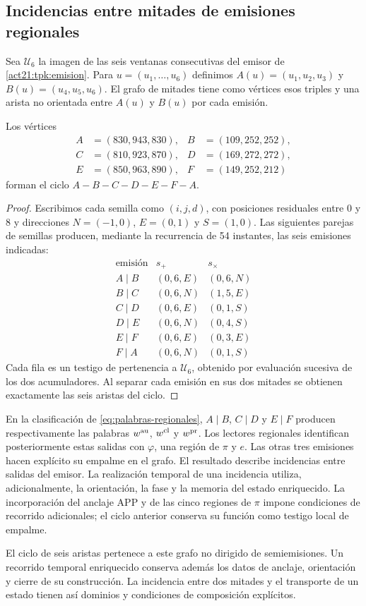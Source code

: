 \subsection{Incidencias entre mitades de emisiones regionales}
\label{sec:rec27-empalmes}

Sea $\mathcal U_6$ la imagen de las seis ventanas consecutivas del emisor
de \ref{act21:tpk:emision}. Para $u=(u_1,\ldots,u_6)$ definimos
$A(u)=(u_1,u_2,u_3)$ y $B(u)=(u_4,u_5,u_6)$.
El grafo de mitades tiene como vértices esos triples y una arista no
orientada entre $A(u)$ y $B(u)$ por cada emisión.

\begin{proposition}
Los vértices
\[
\begin{aligned}
A&=(830,943,830),&B&=(109,252,252),\\
C&=(810,923,870),&D&=(169,272,272),\\
E&=(850,963,890),&F&=(149,252,212)
\end{aligned}
\]
forman el ciclo $A-B-C-D-E-F-A$.
\end{proposition}
\begin{proof}
Escribimos cada semilla como $(i,j,d)$, con posiciones residuales entre
$0$ y $8$ y direcciones $N=(-1,0)$, $E=(0,1)$ y $S=(1,0)$.
Las siguientes parejas de semillas producen, mediante la recurrencia de
54 instantes, las seis emisiones indicadas:
\[
\begin{array}{c|c|c}
\text{emisión}&s_+&s_\times\\\hline
A\mid B&(0,6,E)&(0,6,N)\\
B\mid C&(0,6,N)&(1,5,E)\\
C\mid D&(0,6,E)&(0,1,S)\\
D\mid E&(0,6,N)&(0,4,S)\\
E\mid F&(0,6,E)&(0,3,E)\\
F\mid A&(0,6,N)&(0,1,S)
\end{array}
\]
Cada fila es un testigo de pertenencia a $\mathcal U_6$, obtenido por
evaluación sucesiva de los dos acumuladores. Al separar cada emisión en
sus dos mitades se obtienen exactamente las seis aristas del ciclo.
\end{proof}

En la clasificación de \eqref{eq:palabras-regionales},
\(A\mid B\), \(C\mid D\) y \(E\mid F\) producen respectivamente
las palabras \(w^{\rm au}\), \(w^{\rm cl}\) y \(w^{\rm pr}\).
Los lectores regionales identifican posteriormente estas salidas con
\(\varphi\), una región de \(\pi\) y \(e\).
Las otras tres emisiones hacen explícito su empalme en el grafo.
El resultado describe incidencias entre salidas del emisor. La realización
temporal de una incidencia utiliza, adicionalmente, la orientación, la fase
y la memoria del estado enriquecido. La incorporación del anclaje APP y
de las cinco regiones de $\pi$ impone condiciones de recorrido adicionales;
el ciclo anterior conserva su función como testigo local de empalme.

El ciclo de seis aristas pertenece a este grafo no dirigido de
semiemisiones. Un recorrido temporal enriquecido conserva además los
datos de anclaje, orientación y cierre de su construcción. La incidencia
entre dos mitades y el transporte de un estado tienen así dominios y
condiciones de composición explícitos.
